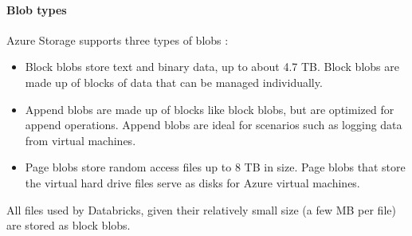     \paragraph{Blob types}
        Azure Storage supports three types of blobs \cite{bib:azure:datalake:intro_to_blob_storage}:
            \begin{itemize}
                \item Block blobs store text and binary data, up to about 4.7 TB. Block blobs are made up of blocks of data that can be managed individually.
                \item Append blobs are made up of blocks like block blobs, but are optimized for append operations. Append blobs are ideal for scenarios such as logging data from virtual machines.
                \item Page blobs store random access files up to 8 TB in size. Page blobs that store the virtual hard drive files serve as disks for Azure virtual machines.
            \end{itemize}
            
        All files used by Databricks, given their relatively small size (a few MB per file) are stored as block blobs.

